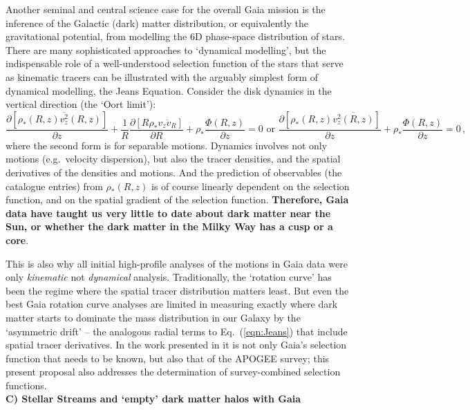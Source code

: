 Another seminal and central science case for the overall Gaia mission is the inference of the Galactic (dark) matter distribution, or equivalently the gravitational potential, from modelling the 6D phase-space distribution of stars. There are many sophisticated approaches to `dynamical modelling', but the indispensable role of a well-understood selection function of the stars that serve as kinematic tracers can be illustrated with the arguably simplest form of dynamical modelling, the Jeans Equation. Consider the disk dynamics in the vertical direction (the `Oort limit'):
\begin{equation}
    \frac{\partial[\rho_*(R,z) \overline{v_z^2}(R,z)]}{\partial z} + \frac{1}{R}
    \frac{\partial[R \rho_* \overline{v_z v_R}]}{\partial R} + \rho_*\frac{\Phi(R,z)}{\partial z}=0 \text{ or } \frac{\partial[\rho_*(R,z) \overline{v_z^2(R,z)}]}{\partial z} + \rho_*\frac{\Phi(R,z)}{\partial z}=0\,,
    \label{eqn:Jeans}
\end{equation}
where the second form is for separable motions. Dynamics involves not only motions (e.g.\ velocity dispersion), but also the tracer densities, and the spatial derivatives of the densities and motions. And the prediction of observables (the catalogue entries) from $\rho_*(R,z)$ is of course linearly dependent on the selection function, and on the spatial gradient of the selection function. \textbf{Therefore, Gaia data have taught us very little to date about dark matter near the Sun, or whether the dark matter in the Milky Way has a cusp or a core}.

This is also why all initial high-profile analyses of the motions in Gaia data \citep{Katz2018a,Antoja2018a} were only \emph{kinematic} not \emph{dynamical} analysis. Traditionally, the `rotation curve' has been the regime where the spatial tracer distribution matters least. But even the best Gaia rotation curve analyses \citep[e.g.][]{Eilers2019a} are limited in measuring exactly where dark matter starts to dominate the mass distribution in our Galaxy by the `asymmetric drift' -- the analogous radial terms to Eq.~(\ref{eqn:Jeans}) that include spatial tracer derivatives. In the work presented in \cite{Eilers2019a} it is not only Gaia's selection function that needs to be known, but also that of the APOGEE survey; this present proposal also addresses the determination of survey-combined selection functions.\\

\noindent\textbf{C) Stellar Streams and `empty' dark matter halos with Gaia\ }

